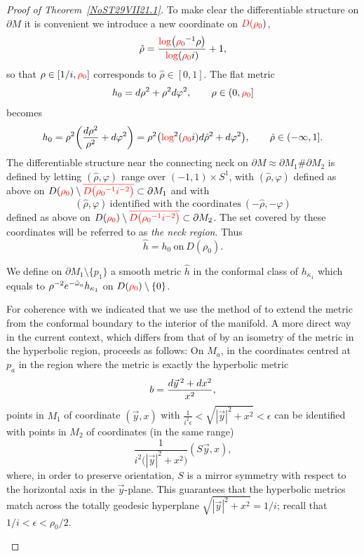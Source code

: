 \documentclass[10pt,a4paper]{article}
\numberwithin{equation}{section}
\newcommand{\hrho}{\hat\rho}
\newcommand{\red}[1]{{\color{red}#1}}
\newcommand{\rhozero}{\red{\rho_0}}
\newcommand{\zomega}{\mathring{\omega}}%
\begin{document}
\begin{proof}[Proof of Theorem~\ref{NoST29VII21.1}]
To make clear the differentiable structure on $\partial M$ it is convenient we introduce a new coordinate on $\red{D(}\rhozero )$,
\begin{equation}\label{25XI21.1}
 \hrho = \frac{ \red{\log} \big( \rhozero ^{-1} \rho\big)}{ \red{\log} ( \rhozero i )}+1,
\end{equation}
so that $\rho\in [1/i,\rhozero ]$ corresponds to $ \hrho\in [0,1]$. The flat metric
\[
 h_0 = {\rm d}\rho^2 + \rho^2 {\rm d}\varphi^2,
 \qquad
 \rho\in (0,\rhozero ]
\]
becomes
\begin{equation*}%
 h_0 =\rho^2
 \bigg(
 \frac{{\rm d}\rho^2}{\rho^2}+ {\rm d}\varphi^2
 \bigg)
 = \rho^2
 \big( \red{\log}^2( \rhozero i) {\rm d}\hrho^2 + {\rm d}\varphi^2 \big)
,
 \qquad
 \hrho\in (-\infty,1]
.
\end{equation*}
%
The differentiable structure near the connecting neck on
$\partial M \approx \partial M_1 \# \partial M_2$ is defined by letting $(\hrho,\varphi)$ range over $(-1,1)\times S^1$, with $(\hrho,\varphi) $
defined as above on
$D(\rhozero) \setminus \red{\overline{D\big(\rhozero^{-1}i^{-2}\big)}}\subset \partial M_1$
and with
\begin{equation}\label{2VI22.41}
 (\hrho,\varphi) \ \text{identified with the coordinates} \ (- \hrho,-\varphi)
\end{equation}
%
defined as above on $D(\rhozero) \setminus \red{\overline{D\big(\rhozero^{-1}i^{-2}\big)}}\subset \partial M_2$.
 The set covered by these coordinates will be referred to as \emph{the neck region}.
Thus
\[
 \hat h = h_0 \ \text{on} \ D(\rho_0).
\]

We define on $\partial M_1\setminus \{p_1\}$ a smooth metric $\hat h $ in the conformal class of $h_{\kappa_1}$ which equals to $\rho^{-2}{{\rm e}^{-\zomega_a}}h_{\kappa_1}$ on $D(\rhozero)\setminus \{0\}$.

\begin{Remark}
For coherence with \cite{ChDelayHPETv1, CDW} we indicated that we use the method of \cite[Section~2]{CDW} to extend the metric from the conformal boundary to the interior of the manifold. A more direct way in the current context, which differs from that of \cite[Section~2]{CDW} by an isometry of the metric in the hyperbolic region, proceeds as follows:
On $M_a$, in the coordinates centred at $p_a$ in the region where the metric is exactly the hyperbolic metric
\[
b=\frac{{\rm d}\vec y\,^2+{\rm d}x^2}{x^2},
\]
points in $M_1$ of coordinate $(\vec y,x)$ with $\frac{1}{i^2\epsilon}<\sqrt{|\vec y|^2+x^2}<\epsilon$ can be identified with points in $M_2$ of coordinates (in the same range)
\[
 \frac1{i^2\big(|\vec y|^2+x^2\big)}(S\vec y,x),
\]
where, in order to preserve orientation, $S$ is a mirror symmetry with respect to the horizontal axis in the $\vec y$-plane.
This guarantees that the hyperbolic metrics match across the totally geodesic hyperplane $\sqrt{|\vec y|^2+x^2}=1/i$; recall that $1/i< \epsilon < \rho_0/2$.
\end{Remark}


\end{proof}
\end{document}

